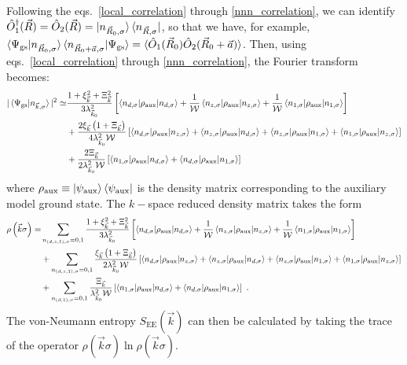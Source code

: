 \documentclass{report}
\numberwithin{equation}{section}
\begin{document}
Following the eqs.~\ref{local_correlation} through \ref{nnn_correlation}, we can identify \(\hat O_1^\dagger(\vec R) = \hat O_2(\vec R) = \ket{n_{\vec R_0,\sigma}}\bra{n_{\vec R,\sigma}}\), so that we have, for example, \(\braket{\Psi_\text{gs} | n_{\vec R_0,\sigma}}\braket{n_{\vec R_0 + \vec a,\sigma} | \Psi_\text{gs}} = \braket{\hat O_1(\vec R_0) \hat O_2(\vec R_0 + \vec a)}\). Then, using eqs.~\ref{local_correlation} through \ref{nnn_correlation}, the Fourier transform becomes:
\begin{equation}\begin{aligned}
|\braket{\Psi_\text{gs} | n_{\vec k,\sigma}}|^2 \simeq& \frac{1 + \xi_{\vec k}^2 + \Xi_{\vec k}^2}{3\lambda_{\vec k_0}^2}\left[\braket{n_{d,\sigma} | \rho_\text{aux} | n_{d,\sigma}} + \frac{1}{\mathcal{W}}\braket{n_{z,\sigma} | \rho_\text{aux} | n_{z,\sigma}} + \frac{1}{\mathcal{W}}\braket{n_{1,\sigma} | \rho_\text{aux} | n_{1,\sigma}}\right]\\
							      &+ \frac{2\xi_{\vec k}\left(1 + \Xi_{\vec k}\right)}{4\lambda_{\vec k_0}^2 \mathcal{W}}\left[\braket{n_{d,\sigma} | \rho_\text{aux} | n_{z,\sigma}} + \braket{n_{z,\sigma} | \rho_\text{aux} | n_{d,\sigma}} + \braket{n_{z,\sigma} | \rho_\text{aux} | n_{1,\sigma}} + \braket{n_{1,\sigma} | \rho_\text{aux} | n_{z,\sigma}} \right] \\
							      &+ \frac{2\Xi_{\vec k}}{2\lambda_{\vec k_0}^2 \mathcal{W}}\left[\braket{n_{1,\sigma} | \rho_\text{aux} | n_{d,\sigma}} + \braket{n_{d,\sigma} | \rho_\text{aux} | n_{1,\sigma}}\right]
\end{aligned}\end{equation}
where \(\rho_\text{aux} \equiv \ket{\psi_\text{aux}}\bra{\psi_\text{aux}}\) is the density matrix corresponding to the auxiliary model ground state. The \(k-\)space reduced density matrix takes the form
\begin{equation}\begin{aligned}
	\rho\left(\vec k\sigma\right) =& \sum_{n_{(d,z,1),\sigma}=0,1}\frac{1 + \xi_{\vec k}^2 + \Xi_{\vec k}^2}{3\lambda_{\vec k_0}^2}\left[\braket{n_{d,\sigma} | \rho_\text{aux} | n_{d,\sigma}} + \frac{1}{\mathcal{W}}\braket{n_{z,\sigma} | \rho_\text{aux} | n_{z,\sigma}} + \frac{1}{\mathcal{W}}\braket{n_{1,\sigma} | \rho_\text{aux} | n_{1,\sigma}}\right] \\
				       &+ \sum_{n_{(d,z,1),\sigma}=0,1}\frac{\xi_{\vec k}\left(1 + \Xi_{\vec k}\right)}{2\lambda_{\vec k_0}^2 \mathcal{W}}\left[\braket{n_{d,\sigma} | \rho_\text{aux} | n_{z,\sigma}} + \braket{n_{z,\sigma} | \rho_\text{aux} | n_{d,\sigma}} + \braket{n_{z,\sigma} | \rho_\text{aux} | n_{1,\sigma}} + \braket{n_{1,\sigma} | \rho_\text{aux} | n_{z,\sigma}} \right]\label{density_matrix_ksapce}\\
				       &+ \sum_{n_{(d,1),\sigma}=0,1}\frac{\Xi_{\vec k}}{\lambda_{\vec k_0}^2 \mathcal{W}}\left[\braket{n_{1,\sigma} | \rho_\text{aux} | n_{d,\sigma}} + \braket{n_{d,\sigma} | \rho_\text{aux} | n_{1,\sigma}}\right]~.
\end{aligned}\end{equation}
The von-Neumann entropy \(S_\text{EE}(\vec k)\) can then be calculated by taking the trace of the operator \(\rho\left(\vec k\sigma\right)\ln \rho\left(\vec k\sigma\right)\).
\end{document}

